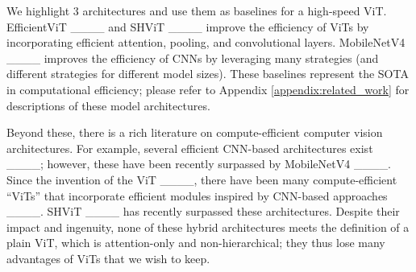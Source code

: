 We highlight $3$ architectures and use them as baselines for a high-speed ViT.  EfficientViT ____ and  SHViT ____ improve the efficiency of ViTs by incorporating efficient attention, pooling, and convolutional layers.  MobileNetV4 ____ improves the efficiency of CNNs by leveraging many strategies (and different strategies for different model sizes). These baselines represent the SOTA in computational efficiency; please refer to Appendix \ref{appendix:related_work} for descriptions of these model architectures.



Beyond these, there is a rich literature on compute-efficient computer vision architectures. For example, several efficient CNN-based architectures exist ____; however, these have been recently surpassed by MobileNetV4 ____. Since the invention of the ViT ____, there have been many compute-efficient ``ViTs'' that incorporate efficient modules inspired by CNN-based approaches ____. SHViT ____ has recently surpassed these architectures. Despite their impact and ingenuity, none of these hybrid architectures meets the definition of a plain ViT, which is attention-only and non-hierarchical; they thus lose many advantages of ViTs that we wish to keep.